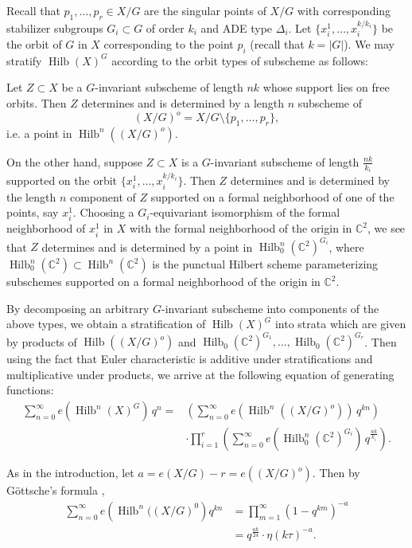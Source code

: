 \documentclass{article}
\theoremstyle{definition}
\newcommand{\CC} {{\mathbb C}}          %
\newcommand{\Hilb}{\operatorname{Hilb}}
\begin{document}
Recall that $p_{1},\dotsc ,p_{r}\in X/G$ are the singular points of
$X/G$ with corresponding stabilizer subgroups $G_{i}\subset G$ of
order $k_{i}$ and ADE type $\Delta_{i}$. Let $\{x_{i}^{1},\dotsc
,x_{i}^{k/k_{i}} \}$ be the orbit of $G$ in $X$ corresponding to the
point $p_{i}$ (recall that $k=|G|$).  We may stratify $\Hilb (X)^{G}$
according to the orbit types of subscheme as follows:

Let $Z\subset X$ be a $G$-invariant subscheme of length $nk$ whose
support lies on free orbits. Then $Z$ determines and is determined by
a length $n$ subscheme of 
\[
(X/G)^{o}  = X/G\setminus \{p_{1},\dotsc ,p_{r} \},
\]
i.e. a point
in $\Hilb^{n}((X/G)^{o})$.

On the other hand, suppose $Z\subset X$ is a $G$-invariant subscheme
of length $\frac{nk}{k_{i}}$ supported on the orbit
$\{x_{i}^{1},\dotsc ,x_{i}^{k/k_{i}} \}$. Then $Z$ determines and is
determined by the length $n$ component of $Z$ supported on a formal
neighborhood of one of the points, say $x_{i}^{1}$. Choosing a
$G_{i}$-equivariant isomorphism of the formal neighborhood of
$x_{i}^{1}$ in $X$ with the formal neighborhood of the origin in
$\CC^{2}$, we see that $Z$ determines and is determined by a point in
$\Hilb_{0}^{n}(\CC^{2})^{G_{i}}$, where $\Hilb_{0}^{n}(\CC^{2})\subset
\Hilb^{n}(\CC^{2})$ is the punctual Hilbert scheme parameterizing
subschemes supported on a formal neighborhood of the origin in
$\CC^{2}$.

By decomposing an arbitrary $G$-invariant subscheme into components of
the above types, we obtain a stratification of $\Hilb (X)^{G}$ into
strata which are given by products of $\Hilb ((X/G)^{o})$ and
$\Hilb_{0}(\CC^{2})^{G_{1}},\dotsc ,\Hilb_{0}(\CC^{2})^{G_{r}}$. Then
using the fact that Euler characteristic is additive under
stratifications and multiplicative under products, we arrive at the
following equation of generating functions:
\begin{align}\label{eqn: stratification formula for sum e(hilb(X)G)}
\nonumber\sum_{n=0}^{\infty} e\left(\Hilb^{n}(X)^{G} \right)\, q^{n}
=&\left(\sum_{n=0}^{\infty} e\left(\Hilb^{n}((X/G)^{o}) \right)\,
q^{kn} \right)\\
& \cdot \prod_{i=1}^{r}\left( \sum_{n=0}^{\infty}
e\left(\Hilb_{0}^{n}(\CC^{2})^{G_{i}} \right) \, q^{\frac{nk}{k_{i}}}
\right) .
\end{align}

As in the introduction, let $a = e(X/G)-r=e\left((X/G)^{o}
\right)$. Then by G\"ottsche's formula \cite{gottsche1990betti},
\begin{align*}
\sum_{n=0}^{\infty} e\left(\Hilb^{n}((X/G)^{0} \right) q^{kn} &=
\prod_{m=1}^{\infty} (1-q^{km})^{-a}\\
&= q^{\frac{ak}{24}} \cdot \eta (k\tau )^{-a}. 
\end{align*}
\end{document}
